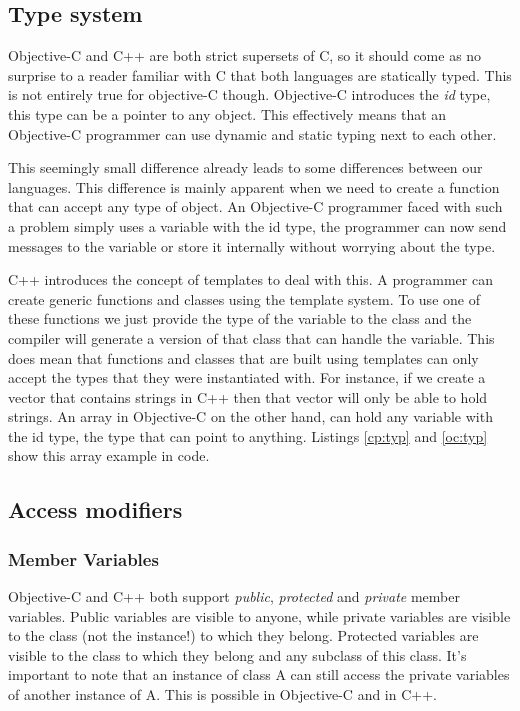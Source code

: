 \documentclass[12pt, a4paper, twocolumn]{article}
\begin{document}
\subsection{Type system}
\label{sec:types}

Objective-C and C++ are both strict supersets of C, so it should come as no surprise to a reader familiar with C that both languages are statically typed. This is not entirely true for objective-C though. Objective-C introduces the \textit{id} type, this type can be a pointer to any object. This effectively means that an Objective-C programmer can use dynamic and static typing next to each other. 

This seemingly small difference already leads to some differences between our languages. This difference is mainly apparent when we need to create a function that can accept any type of object. An Objective-C programmer faced with such a problem simply uses a variable with the id type, the programmer can now send messages to the variable or store it internally without worrying about the type.

C++ introduces the concept of templates to deal with this. A programmer can create generic functions and classes using the template system. To use one of these functions we just provide the type of the variable to the class and the compiler will generate a version of that class that can handle the variable. This does mean that functions and classes that are built using templates can only accept the types that they were instantiated with. For instance, if we create a vector that contains strings in C++ then that vector will only be able to hold strings. An array in Objective-C on the other hand, can hold any variable with the id type, the type that can point to anything. Listings \ref{cp:typ} and \ref{oc:typ} show this array example in code.

\subsection{Access modifiers}
\label{sec:access}
\subsubsection{Member Variables}
Objective-C and C++ both support \textit{public}, \textit{protected} and \textit{private} member variables. Public variables are visible to anyone, while private variables are visible to the class (not the instance!) to which they belong. Protected variables are visible to the class to which they belong and any subclass of this class. It's important to note that an instance of class A can still access the private variables of another instance of A. This is possible in Objective-C and in C++.
\end{document}
